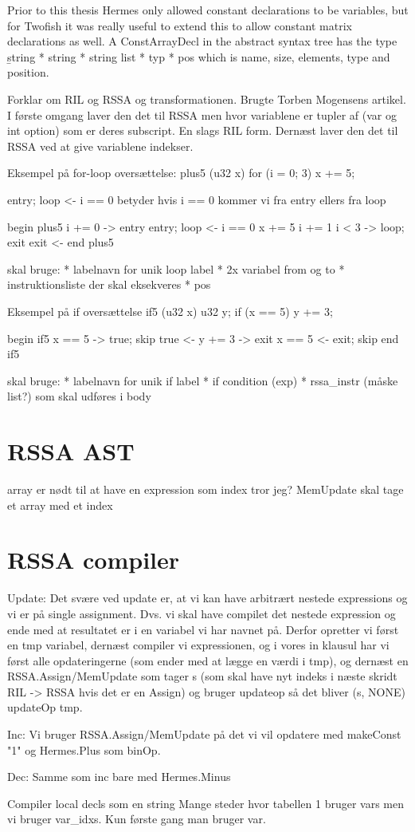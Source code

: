 Prior to this thesis Hermes only allowed constant declarations to be variables, but for Twofish it was really useful to extend this to allow constant matrix declarations as well. A ConstArrayDecl in the abstract syntax tree has the type \b{string * string * string list * typ * pos} which is name, size, elements, type and position.

Forklar om RIL og RSSA og transformationen.
Brugte Torben Mogensens artikel.
I første omgang laver den det til RSSA men hvor variablene er tupler af (var og int option) som er deres subscript. En slags RIL form.
Dernæst laver den det til RSSA ved at give variablene indekser.

Eksempel på for-loop oversættelse:
plus5 (u32 x) {
  for (i = 0; 3) {
    x += 5;
  }
}

entry; loop <- i == 0 betyder hvis i == 0 kommer vi fra entry ellers fra loop

begin plus5
i += 0
-> entry
entry; loop <- i == 0
x += 5
i += 1
i < 3 -> loop; exit
exit <-
end plus5

skal bruge: 
* labelnavn for unik loop label
* 2x variabel from og to
* instruktionsliste der skal eksekveres
* pos


Eksempel på if oversættelse
if5 (u32 x) {
  u32 y;
  if (x == 5) {
    y += 3;
  }
}

begin if5
x == 5 -> true; skip
true <-
y += 3
-> exit
x == 5 <- exit; skip
end if5

skal bruge:
* labelnavn for unik if label
* if condition (exp)
* rssa\_instr (måske list?) som skal udføres i body
\section{RSSA AST}
array er nødt til at have en expression som index tror jeg?
MemUpdate skal tage et array med et index 

\section{RSSA compiler}
Update:
Det svære ved update er, at vi kan have arbitrært nestede expressions og vi er på single assignment.
Dvs. vi skal have compilet det nestede expression og ende med at resultatet er i en variabel vi har navnet på.
Derfor opretter vi først en tmp variabel, dernæst compiler vi expressionen, og i vores in klausul har vi først alle opdateringerne (som ender med at lægge en værdi i tmp), og dernæst en RSSA.Assign/MemUpdate som tager s (som skal have nyt indeks i næste skridt RIL -> RSSA hvis det er en Assign) og bruger updateop så det bliver (s, NONE) updateOp tmp.



Inc:
Vi bruger RSSA.Assign/MemUpdate på det vi vil opdatere med makeConst "1" og Hermes.Plus som binOp.

Dec:
Samme som inc bare med Hermes.Minus

Compiler local decls som en string
Mange steder hvor tabellen 1 bruger vars men vi bruger var\_idxs. Kun første gang man bruger var.
